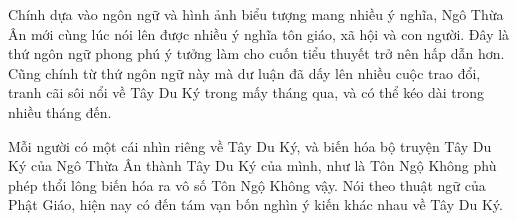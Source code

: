 Chính dựa vào ngôn ngữ và hình ảnh biểu tượng mang nhiều ý nghĩa, Ngô Thừa Ân mới cùng lúc nói lên được nhiều ý nghĩa tôn giáo, xã hội và con người. Đây là thứ ngôn ngữ phong phú ý tưởng làm cho cuốn tiểu thuyết trở nên hấp dẫn hơn. Cũng chính từ thứ ngôn ngữ này mà dư luận đã dấy lên nhiều cuộc trao đổi, tranh cãi sôi nổi về Tây Du Ký trong mấy tháng qua, và có thể kéo dài trong nhiều tháng đến.

Mỗi người có một cái nhìn riêng về Tây Du Ký, và biến hóa bộ truyện Tây Du Ký của Ngô Thừa Ân thành Tây Du Ký của mình, như là Tôn Ngộ Không phù phép thổi lông biến hóa ra vô số Tôn Ngộ Không vậy. Nói theo thuật ngữ của Phật Giáo, hiện nay có đến tám vạn bốn nghìn ý kiến khác nhau về Tây Du Ký.
